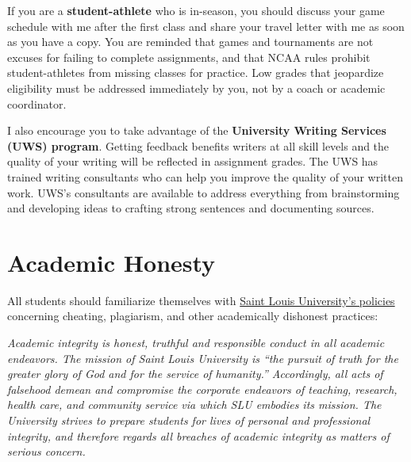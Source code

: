 \documentclass{tufte-book}
\begin{document}
\par If you are a \textbf{student-athlete} who is in-season, you should discuss your game schedule with me after the first class and share your travel letter with me as soon as you have a copy. You are reminded that games and tournaments are not excuses for failing to complete assignments, and that NCAA rules prohibit student-athletes from missing classes for practice. Low grades that jeopardize eligibility must be addressed immediately by you, not by a coach or academic coordinator.

\par I also encourage you to take advantage of the \textbf{University Writing Services (UWS) program}. Getting feedback benefits writers at all skill levels and the quality of your writing will be reflected in assignment grades. The UWS has trained writing consultants who can help you improve the quality of your written work. UWS's consultants are available to address everything from brainstorming and developing ideas to crafting strong sentences and documenting sources.

\vspace{3mm}
\section{Academic Honesty}
All students should familiarize themselves with \href{http://www.slu.edu/Documents/provost/academic_affairs/Academic\%20Integrity\%20Policy\%20FINAL\%20\%206-26-15.pdf}{Saint Louis University's policies} concerning cheating, plagiarism, and other academically dishonest practices: 

\vspace{3mm}
\begin{adjustwidth}{1cm}{}
\textit{Academic integrity is honest, truthful and responsible conduct in all academic endeavors. The mission of Saint Louis University is ``the pursuit of truth for the greater glory of God and for the service of humanity.''  Accordingly, all acts of falsehood demean and compromise the corporate endeavors of teaching, research, health care, and community service via which SLU embodies its mission. The University strives to prepare students for lives of personal and professional integrity, and therefore regards all breaches of academic integrity as matters of serious concern.}
\end{adjustwidth}
\end{document}
